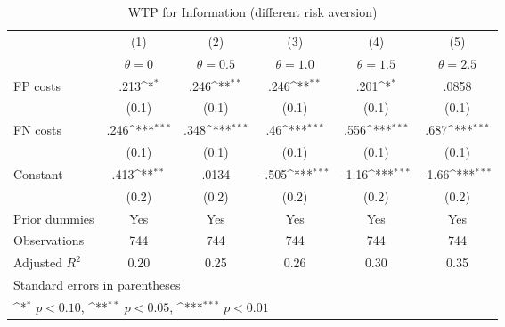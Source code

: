 \begin{table}[htbp]\centering
\def\sym#1{\ifmmode^{#1}\else\(^{#1}\)\fi}
\caption{WTP for Information (different risk aversion)}
\begin{tabular}{l*{5}{c}}
\hline\hline
                &\multicolumn{1}{c}{(1)}&\multicolumn{1}{c}{(2)}&\multicolumn{1}{c}{(3)}&\multicolumn{1}{c}{(4)}&\multicolumn{1}{c}{(5)}\\
                &\multicolumn{1}{c}{$\theta=0$}&\multicolumn{1}{c}{$\theta=0.5$}&\multicolumn{1}{c}{$\theta=1.0$}&\multicolumn{1}{c}{$\theta=1.5$}&\multicolumn{1}{c}{$\theta=2.5$}\\
\hline
FP costs        &     .213\sym{*}  &     .246\sym{**} &     .246\sym{**} &     .201\sym{*}  &    .0858         \\
                &    (0.1)         &    (0.1)         &    (0.1)         &    (0.1)         &    (0.1)         \\
FN costs        &     .246\sym{***}&     .348\sym{***}&      .46\sym{***}&     .556\sym{***}&     .687\sym{***}\\
                &    (0.1)         &    (0.1)         &    (0.1)         &    (0.1)         &    (0.1)         \\
Constant        &     .413\sym{**} &    .0134         &    -.505\sym{***}&    -1.16\sym{***}&    -1.66\sym{***}\\
                &    (0.2)         &    (0.2)         &    (0.2)         &    (0.2)         &    (0.2)         \\
Prior dummies   &      Yes         &      Yes         &      Yes         &      Yes         &      Yes         \\
\hline
Observations    &      744         &      744         &      744         &      744         &      744         \\
Adjusted \(R^{2}\)&     0.20         &     0.25         &     0.26         &     0.30         &     0.35         \\
\hline\hline
\multicolumn{6}{l}{\footnotesize Standard errors in parentheses}\\
\multicolumn{6}{l}{\footnotesize \sym{*} \(p<0.10\), \sym{**} \(p<0.05\), \sym{***} \(p<0.01\)}\\
\end{tabular}
\end{table}
